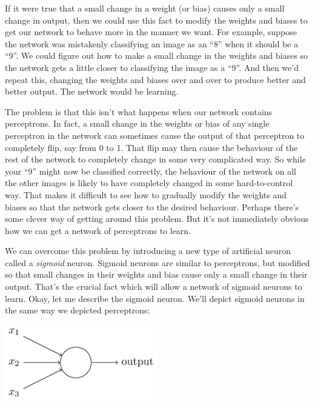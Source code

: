 If it were true that a small change in a weight (or bias) causes only a small change in output, then we could use this fact to modify the weights and biases to get our network to behave more in the manner we want. For example, suppose the network was mistakenly classifying an image as an ``8'' when it should be a ``9''. We could figure out how to make a small change in the weights and biases so the network gets a little closer to classifying the image as a ``9''. And then we'd repeat this, changing the weights and biases over and over to produce better and better output. The network would be learning.

The problem is that this isn't what happens when our network contains perceptrons. In fact, a small change in the weights or bias of any single perceptron in the network can sometimes cause the output of that perceptron to completely flip, say from 0 to 1. That flip may then cause the behaviour of the rest of the network to completely change in some very complicated way. So while your ``9'' might now be classified correctly, the behaviour of the network on all the other images is likely to have completely changed in some hard-to-control way. That makes it difficult to see how to gradually modify the weights and biases so that the network gets closer to the desired behaviour. Perhaps there's some clever way of getting around this problem. But it's not immediately obvious how we can get a network of perceptrons to learn.

We can overcome this problem by introducing a new type of artificial neuron called a \textit{sigmoid} neuron. Sigmoid neurons are similar to perceptrons, but modified so that small changes in their weights and bias cause only a small change in their output. That's the crucial fact which will allow a network of sigmoid neurons to learn.
Okay, let me describe the sigmoid neuron. We'll depict sigmoid neurons in the same way we depicted perceptrons: 

{\centering
\includegraphics[width=0.5\textwidth,]{pic/sigmoidneuron01}
\par}

